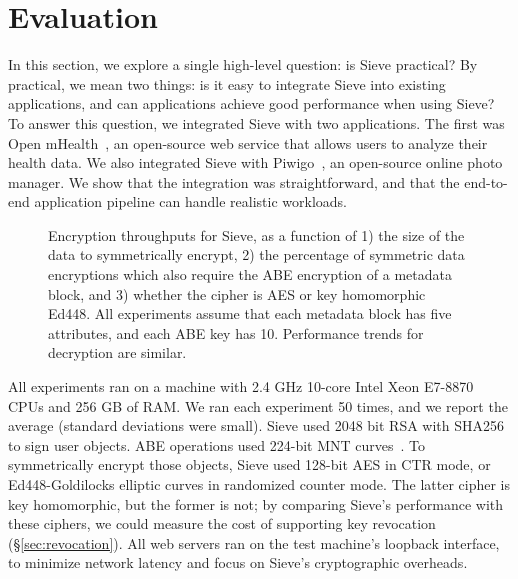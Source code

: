 \chapter{Evaluation}
\label{sec:evaluation}

In this section, we explore a single
high-level question: is Sieve practical?
By practical, we mean two
things: is it easy to integrate Sieve into existing applications, and
can applications achieve good performance when using Sieve?
To answer this question, we integrated
Sieve with two applications. The first
was Open mHealth~\cite{omh}, an open-source
web service that allows users to analyze
their health data. We also integrated Sieve
with Piwigo~\cite{piwigo}, an open-source
online photo manager. We show that the
integration was straightforward, and that
the end-to-end application pipeline can
handle realistic workloads.

\begin{figure*}
\centering
    \caption[ABE throughputs for Sieve]{Encryption throughputs for Sieve, as a function of 1) the size of
             the data to symmetrically encrypt, 2) the percentage of symmetric
             data encryptions which also require the ABE encryption of a
             metadata block, and 3) whether the cipher is AES or
             key homomorphic Ed448. All experiments assume that each metadata
             block has five attributes, and each ABE key has 10. Performance
             trends for decryption are similar.}
\label{fig:throughput}
\end{figure*}

All experiments ran on a machine with 2.4 GHz 10-core
Intel Xeon E7-8870 CPUs and 256 GB of RAM. We ran each
experiment 50 times, and we report the average
(standard deviations were small).
Sieve used 2048 bit RSA with SHA256 to sign
user objects. ABE operations used 224-bit MNT
curves~\cite{mnt224}. To symmetrically encrypt
those objects, Sieve used 128-bit AES in CTR
mode, or Ed448-Goldilocks elliptic curves in
randomized counter mode. The latter cipher is
key homomorphic, but the former is not; by
comparing Sieve's performance with these ciphers,
we could measure the cost of supporting key
revocation (\S\ref{sec:revocation}). All web
servers ran on the test machine's loopback
interface, to minimize network latency and
focus on Sieve's cryptographic overheads.

